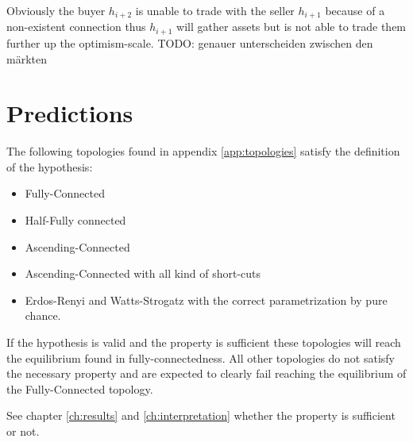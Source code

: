 \documentclass[Bachelorarbeit.tex]{subfiles}
\begin{document}
Obviously the buyer $h_{i+2}$ is unable to trade with the seller $h_{i+1}$ because of a non-existent connection thus $h_{i+1}$ will gather assets but is not able to trade them further up the optimism-scale. TODO: genauer unterscheiden zwischen den märkten

\section{Predictions}
The following topologies found in appendix \ref{app:topologies} satisfy the definition of the hypothesis:

\begin{itemize}
\item Fully-Connected
\item Half-Fully connected
\item Ascending-Connected
\item Ascending-Connected with all kind of short-cuts
\item Erdos-Renyi and Watts-Strogatz with the correct parametrization by pure chance.
\end{itemize}

If the hypothesis is valid and the property is sufficient these topologies will reach the equilibrium found in fully-connectedness. All other topologies do not satisfy the necessary property and are expected to clearly fail reaching the equilibrium of the Fully-Connected topology.

\medskip

See chapter \ref{ch:results} and \ref{ch:interpretation} whether the property is sufficient or not. 
\end{document}

